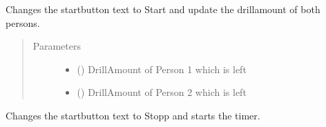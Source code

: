 \documentclass[letterpaper,10pt,english]{sphinxmanual}
\begin{document}
\begin{fulllineitems}
\begin{fulllineitems}
\label{\detokenize{anoog.automation:anoog.automation.graphical_user_interface.Train_Window.drill_ends}}
\sphinxAtStartPar
Changes the start\sphinxhyphen{}button text to Start and update the drill\sphinxhyphen{}amount of both persons.
\begin{quote}\begin{description}
\item[{Parameters}] \leavevmode\begin{itemize}
\item {} 
\sphinxAtStartPar
{} () \textendash{} Drill\sphinxhyphen{}Amount of Person 1 which is left

\item {} 
\sphinxAtStartPar
{} () \textendash{} Drill\sphinxhyphen{}Amount of Person 2 which is left

\end{itemize}

\end{description}\end{quote}

\end{fulllineitems}


\begin{fulllineitems}
\label{\detokenize{anoog.automation:anoog.automation.graphical_user_interface.Train_Window.drill_starts}}
\sphinxAtStartPar
Changes the start\sphinxhyphen{}button text to Stopp and starts the timer.

\end{fulllineitems}



\end{fulllineitems}
\end{document}
